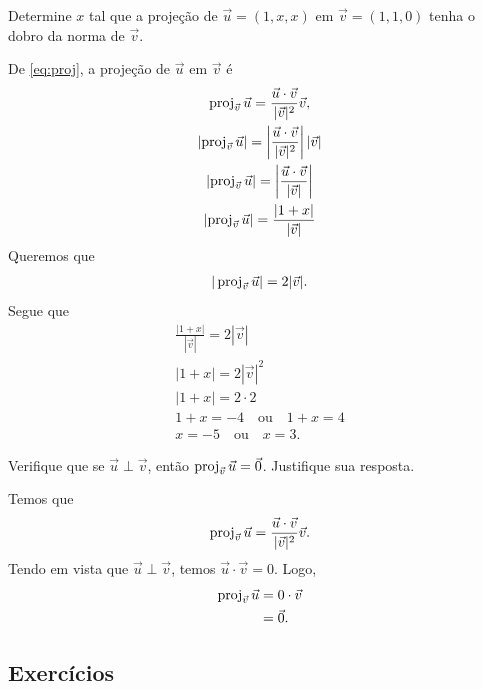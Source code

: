 \begin{exeresol}
  Determine $x$ tal que a projeção de $\vec{u}=(1,x,x)$ em $\vec{v}=(1,1,0)$ tenha o dobro da norma de $\vec{v}$.
\end{exeresol}
\begin{resol}
  De \eqref{eq:proj}, a projeção de $\vec{u}$ em $\vec{v}$ é
  \begin{gather}
    \operatorname{proj}_{\vec{v}}\vec{u} = \frac{\vec{u}\cdot\vec{v}}{|\vec{v}|^2}\vec{v},\\
    \left|\operatorname{proj}_{\vec{v}}\vec{u}\right| = \left|\frac{\vec{u}\cdot\vec{v}}{|\vec{v}|^2}\right||\vec{v}| \\
    \left|\operatorname{proj}_{\vec{v}}\vec{u}\right| = \left|\frac{\vec{u}\cdot\vec{v}}{|\vec{v}|}\right| \\
      \left|\operatorname{proj}_{\vec{v}}\vec{u}\right| = \frac{|1+x|}{|\vec{v}|}
  \end{gather}
  Queremos que
  \begin{gather}
    |\operatorname{proj}_{\vec{v}}\vec{u}| = 2|\vec{v}|.
  \end{gather}
  Segue que
  \begin{gather}
    \frac{|1+x|}{|\vec{v}|} = 2|\vec{v}|\\
      |1+x| = 2|\vec{v}|^2 \\
      |1+x| = 2\cdot 2 \\
      1+x = -4\quad\text{ou}\quad 1+x=4\\
      x=-5\quad\text{ou}\quad x=3.
  \end{gather}
\end{resol}

\begin{exeresol}
  Verifique que se $\vec{u}\perp\vec{v}$, então $\operatorname{proj}_{\vec{v}}\vec{u}=\vec{0}$. Justifique sua resposta.
\end{exeresol}
\begin{resol}
  Temos que
  \begin{equation}
    \operatorname{proj}_{\vec{v}}\vec{u} = \frac{\vec{u}\cdot\vec{v}}{|\vec{v}|^2}\vec{v}.
  \end{equation}
  Tendo em vista que $\vec{u}\perp\vec{v}$, temos $\vec{u}\cdot\vec{v}=0$. Logo,
  \begin{align}
    \operatorname{proj}_{\vec{v}}\vec{u} &= 0\cdot\vec{v}\\
                           &= \vec{0}.
  \end{align}
\end{resol}

\subsection*{Exercícios}

